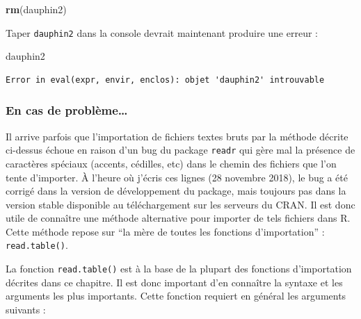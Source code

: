 \documentclass[
  a4paper,
]{article}
\newenvironment{Shaded}{\begin{snugshade}}{\end{snugshade}}
\newcommand{\KeywordTok}[1]{\textcolor[rgb]{0.12,0.11,0.11}{\textbf{#1}}}
\newcommand{\NormalTok}[1]{\textcolor[rgb]{0.12,0.11,0.11}{#1}}
\begin{document}
\begin{Shaded}
\begin{Highlighting}[]
\KeywordTok{rm}\NormalTok{(dauphin2)}
\end{Highlighting}
\end{Shaded}

Taper \texttt{dauphin2} dans la console devrait maintenant produire une erreur :

\begin{Shaded}
\begin{Highlighting}[]
\NormalTok{dauphin2}
\end{Highlighting}
\end{Shaded}

\begin{verbatim}
Error in eval(expr, envir, enclos): objet 'dauphin2' introuvable
\end{verbatim}

\hypertarget{importproblem}{%
\subsubsection{En cas de problème\ldots{}}\label{importproblem}}

Il arrive parfois que l'importation de fichiers textes bruts par la méthode décrite ci-dessus échoue en raison d'un bug du package \texttt{readr} qui gère mal la présence de caractères spéciaux (accents, cédilles, etc) dans le chemin des fichiers que l'on tente d'importer. À l'heure où j'écris ces lignes (28 novembre 2018), le bug a été corrigé dans la version de développement du package, mais toujours pas dans la version stable disponible au téléchargement sur les serveurs du CRAN. Il est donc utile de connaître une méthode alternative pour importer de tels fichiers dans R. Cette méthode repose sur ``la mère de toutes les fonctions d'importation'' : \texttt{read.table()}.

La fonction \texttt{read.table()} est à la base de la plupart des fonctions d'importation décrites dans ce chapitre. Il est donc important d'en connaître la syntaxe et les arguments les plus importants. Cette fonction requiert en général les arguments suivants :
\end{document}
